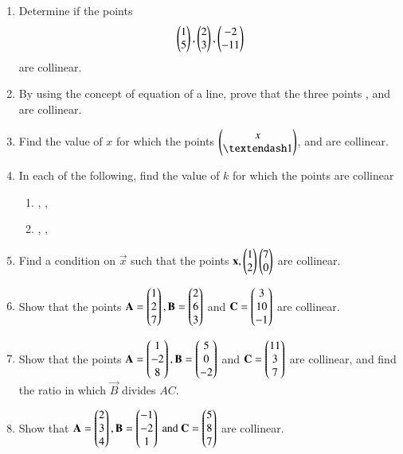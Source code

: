 \begin{enumerate}[label=\arabic*.,ref=\thesubsection.\theenumi]
\item Determine if the points 
\begin{align}
\begin{pmatrix}1\\5\end{pmatrix}, \begin{pmatrix}2\\3\end{pmatrix}, \begin{pmatrix}-2\\-11\end{pmatrix}
\end{align}
%
are collinear.	
\item By using the concept of equation of a line, prove that the three points ,  and  are collinear.
\item Find the value of $x$ for which the points $\myvec{x\\ – 1}$,  and  are collinear.
\item  In each of the following, find the value of $k$ for which the points are collinear

\begin{enumerate}
\item {},  ,   
\item {},  ,   
\end{enumerate}
\item Find a condition on $\vec{x}$  such that the points $\mathbf{x}, \begin{pmatrix}1\\2\end{pmatrix}\begin{pmatrix}7\\0\end{pmatrix}$ are collinear.
\item Show that the points 
$\mathbf{A}=\begin{pmatrix}1\\2\\7\end{pmatrix}, \mathbf{B}=\begin{pmatrix}2\\6\\3\end{pmatrix}$ and $ \mathbf{C}=\begin{pmatrix}3\\10\\-1\end{pmatrix}$ are collinear.
\item Show that the points 
$\mathbf{A}=\begin{pmatrix}1\\-2\\8\end{pmatrix}, \mathbf{B}=\begin{pmatrix}5\\0\\-2\end{pmatrix}$ and $ \mathbf{C}=\begin{pmatrix}11\\3\\7\end{pmatrix}$ are collinear, and find the ratio in which $\vec{B}$ divides $AC$.
\item Show that 
$
\mathbf{A}=\begin{pmatrix}2\\3\\4\end{pmatrix}, 
\mathbf{B}=\begin{pmatrix}-1\\-2\\1\end{pmatrix} \text{ and } 
\mathbf{C}=\begin{pmatrix}5\\8\\7\end{pmatrix}$  
are collinear.
\end{enumerate}
%
